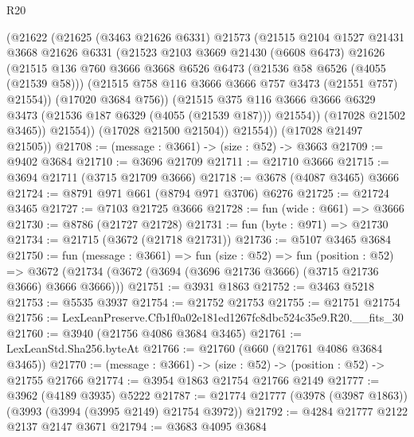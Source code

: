\begin{lexlean}{R20}
\begin{coremodule}
              (@21622
                (@21625
                  (@3463 @21626 @6331)
                  @21573
                  (@21515
                    @2104
                    @1527
                    @21431
                    @3668
                    @21626
                    @6331
                    (@21523
                      @2103
                      @3669
                      @21430
                      (@6608 @6473)
                      @21626
                      (@21515
                        @136
                        @760
                        @3666
                        @3668
                        @6526
                        @6473
                        (@21536 @58 @6526 (@4055 (@21539 @58)))
                        (@21515 @758 @116 @3666 @3666 @757 @3473 (@21551 @757) @21554))
                      (@17020 @3684 @756))
                    (@21515
                      @375
                      @116
                      @3666
                      @3666
                      @6329
                      @3473
                      (@21536 @187 @6329 (@4055 (@21539 @187)))
                      @21554))
                  (@17028 @21502 @3465))
                @21554))
            (@17028 @21500 @21504))
          @21554))
      (@17028 @21497 @21505))
@21708 := (message : @3661) -> (size : @52) -> @3663
@21709 := @9402 @3684
@21710 := @3696 @21709
@21711 := @21710 @3666
@21715 := @3694 @21711 (@3715 @21709 @3666)
@21718 := @3678 (@4087 @3465) @3666
@21724 := @8791 @971 @661 (@8794 @971 @3706) @6276
@21725 := @21724 @3465
@21727 := @7103 @21725 @3666
@21728 := fun (wide : @661) => @3666
@21730 := @8786 (@21727 @21728)
@21731 := fun (byte : @971) => @21730
@21734 := @21715 (@3672 (@21718 @21731))
@21736 := @5107 @3465 @3684
@21750 := fun (message : @3661) =>
  fun (size : @52) =>
  fun (position : @52) =>
  @3672 (@21734 (@3672 (@3694 (@3696 @21736 @3666) (@3715 @21736 @3666) @3666 @3666)))
@21751 := @3931 @1863
@21752 := @3463 @5218
@21753 := @5535 @3937
@21754 := @21752 @21753
@21755 := @21751 @21754
@21756 := LexLeanPreserve.Cfb1f0a02e181ed1267fc8dbc524c35e9.R20.__fits_30
@21760 := @3940 (@21756 @4086 @3684 @3465)
@21761 := LexLeanStd.Sha256.byteAt
@21766 := @21760 (@660 (@21761 @4086 @3684 @3465))
@21770 := (message : @3661) -> (size : @52) -> (position : @52) -> @21755 @21766
@21774 := @3954 @1863 @21754 @21766 @2149
@21777 := @3962 (@4189 @3935) @5222
@21787 := @21774 @21777 (@3978 (@3987 @1863)) (@3993 (@3994 (@3995 @2149) @21754 @3972))
@21792 := @4284 @21777 @2122 @2137 @2147 @3671
@21794 := @3683 @4095 @3684

\end{coremodule}
\end{lexlean}
